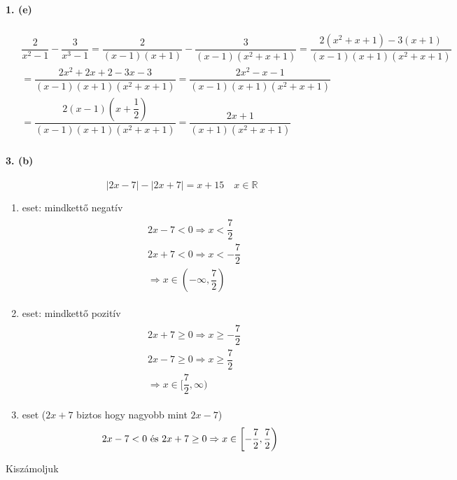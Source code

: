 \documentclass[12pt,a4paper,fleqn]{article}
\newcommand{\myparagraph}[1]{\paragraph{#1}\mbox{}}
\begin{document}
\myparagraph{1. (e)}
\begin{align*}
  \begin{split}
    & \dfrac{2}{x^2-1} -\dfrac{3}{x^3-1} = \dfrac{2}{(x-1)(x+1)} - \dfrac{3}{(x-1)(x^2+x+1)} =
        \dfrac{2(x^2+x+1)-3(x+1)}{(x-1)(x+1)(x^2+x+1)} \\[10pt]
    &= \dfrac{2x^2+2x+2-3x-3}{(x-1)(x+1)(x^2+x+1)} = \dfrac{2x^2-x-1}{(x-1)(x+1)(x^2+x+1)} \\[10pt]
    &= \dfrac{2(x-1)(x+\dfrac{1}{2})}{(x-1)(x+1)(x^2+x+1)} = \dfrac{2x+1}{(x+1)(x^2+x+1)}
  \end{split}
\end{align*}


\myparagraph{3. (b)}
\[ |2x-7|-|2x+7|=x+15 \quad x \in \mathbb{R} \]
\begin{enumerate}
  \item eset: mindkettő negatív
  \begin{align*}
    \begin{split}
      &2x - 7 < 0 \Rightarrow x < \dfrac{7}{2} \\
      &2x + 7 < 0 \Rightarrow x < -\dfrac{7}{2} \\
      &\Longrightarrow x \in (-\infty, \dfrac{7}{2})
    \end{split}
  \end{align*}
  \item eset: mindkettő pozitív
  \begin{align*}
    \begin{split}
      &2x + 7 \geq 0 \Rightarrow x \geq -\dfrac{7}{2} \\
      &2x - 7 \geq 0 \Rightarrow x \geq \dfrac{7}{2} \\
      &\Longrightarrow x \in [\dfrac{7}{2}, \infty)
    \end{split}
  \end{align*}
  \item eset ($2x+7$ biztos hogy nagyobb mint $2x-7$)
  \[ 2x-7<0$ és $2x+7 \geq 0 \Rightarrow x \in \left[ -\dfrac{7}{2}, \dfrac{7}{2} \right) \]
\end{enumerate}
Kiszámoljuk
\end{document}
